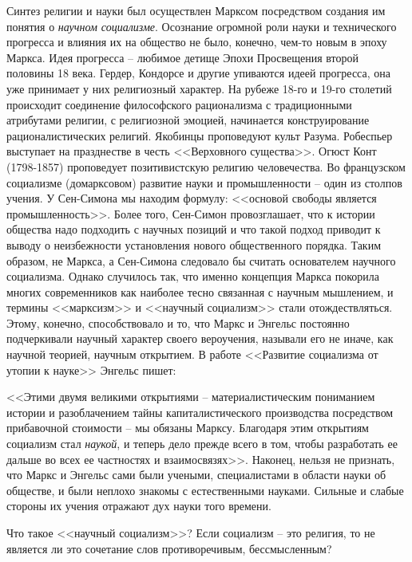 \documentclass{book}
\begin{document}
Синтез религии и науки был осуществлен Марксом посред­ством создания им понятия о \textit{научном социализме}.  Осознание огромной роли науки и технического прогресса и влияния их на общество не было, конечно, чем-то новым в эпоху Маркса. Идея прогресса -- любимое детище Эпохи Просвещения второй половины 18 века. Гердер, Кондорсе и другие упиваются идеей прогресса, она уже принимает у них религиозный характер. На рубеже 18-го и 19-го столетий происходит соединение философского рационализма с традиционными атрибутами религии, с религиозной эмоцией, начинается конструирование рационалистических религий. Якобинцы проповедуют культ Разума. Робеспьер выступает на празднестве в честь <<Верховного существа>>. Огюст Конт (1798-1857) проповедует позитивистскую религию человечества. Во французском социализме (домарксовом) развитие науки и промышленности -- один из столпов учения. У Сен-Симона мы находим формулу: <<основой свободы является промышленность>>. Более того, Сен-Симон провозглашает, что к истории общества надо 
подходить с научных позиций и что такой подход приводит к выводу о неизбежности установления нового общественного порядка. Таким образом, не Маркса, а Сен-Симона следовало бы считать основателем научного социализма. Однако случилось так, что именно концепция Маркса покорила многих современников как наиболее тесно связанная с научным мышлением, и термины <<марксизм>> и <<научный социализм>> стали отождествляться. Этому, конечно, способствовало и то, что Маркс и Энгельс постоянно подчеркивали научный характер своего вероучения, называли его не иначе, как научной теорией, научным открытием. В работе <<Развитие социализма от утопии к науке>> Энгельс пишет:

<<Этими двумя великими открытиями -- материалистическим пониманием истории и разоблачением тайны капиталистиче­ского производства посредством прибавочной стоимости -- мы обязаны Марксу. Благодаря этим открытиям социализм стал \textit{наукой},  и теперь дело прежде всего в том, чтобы разработать ее дальше во всех ее частностях и взаимосвязях>>. Наконец, нельзя не признать, что Маркс и Энгельс сами были учеными, специалистами в области науки об обществе, и были неплохо знакомы с естественными науками. Сильные и слабые стороны их учения отражают дух науки того времени.

Что такое <<научный социализм>>? Если социализм -- это ре­лигия, то не является ли это сочетание слов противоречивым, бессмысленным?
\end{document}
